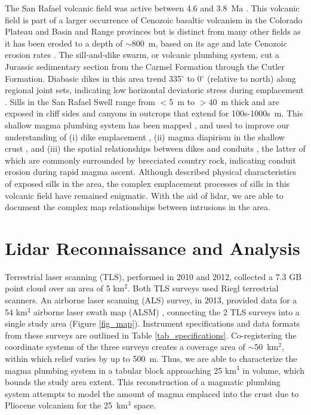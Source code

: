 \documentclass[12pt,letter]{article}
\begin{document}
The San Rafael volcanic field was active between 4.6 and 3.8~Ma \citep{delaney1997physical}. This volcanic field is part of a larger occurrence of Cenozoic basaltic volcanism in the Colorado Plateau and Basin and Range provinces but is distinct from many other fields as it has been eroded to a depth of $\sim$800~m, based on its age and late Cenozoic erosion rates \citep[e.g.]{pederson2002colorado}. The sill-and-dike swarm, or volcanic plumbing system, cut a Jurassic sedimentary section from the Carmel Formation through the Cutler Formation. Diabasic dikes in this area trend 335$^{\circ}$ to 0$^{\circ}$ (relative to north) along regional joint sets, indicating low horizontal deviatoric stress during emplacement \citep{delaney1997physical}. Sills in the San Rafael Swell range from $<$5~m to $>$40~m thick and are exposed in cliff sides and canyons in outcrops that extend for 100s-1000s~m. This shallow magma plumbing system has been mapped \citep{delaney1997physical}, and used to improve our understanding of (i) dike emplacement \citep{delaney1986field}, (ii) magma diapirism in the shallow crust \citep{diez2009evidence}, and (iii) the spatial relationships between dikes and conduits \citep{kiyosugi2012relationship}, the latter of which are commonly surrounded by brecciated country rock, indicating conduit erosion during rapid magma ascent. Although \citet{gartner1986geometry} described physical characteristics of exposed sills in the area, the complex emplacement processes of sills in this volcanic field have remained enigmatic. With the aid of lidar, we are able to document the complex map relationships between intrusions in the area.

\section{Lidar Reconnaissance and Analysis}

Terrestrial laser scanning (TLS), performed in 2010 and 2012, collected a 7.3 GB point cloud over an area of 5 km$^2$. Both TLS surveys used Riegl terrestrial scanners. An airborne laser scanning (ALS) survey, in 2013, provided data for a 54 km$^2$ airborne laser swath map (ALSM) \citep{richardson2013alsm}, connecting the 2 TLS surveys into a single study area (Figure \ref{fig_map}). Instrument specifications and data formats from these surveys are outlined in Table \ref{tab_specifications}. Co-registering the coordinate systems of the three surveys creates a coverage area of $\sim$50~km$^2$, within which relief varies by up to 500~m. Thus, we are able to characterize the magma plumbing system in a tabular block approaching 25 km$^3$ in volume, which bounds the study area extent. This reconstruction of a magmatic plumbing system attempts to model the amount of magma emplaced into the crust due to Pliocene volcanism for the 25~km$^3$ space.
\end{document}
